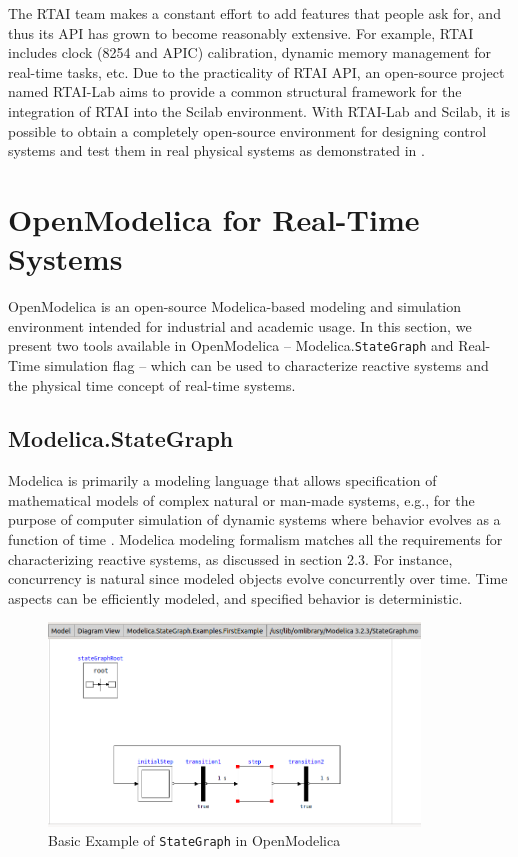 \documentclass[12pt]{report}
\begin{document}
The RTAI team makes a constant effort to add features that people ask for, and thus its API has grown to become reasonably extensive. For example, RTAI includes clock (8254 and APIC) calibration, dynamic memory management for real-time tasks, etc. Due to the practicality of RTAI API,  an open-source project named  RTAI-Lab aims to provide a common structural framework for the integration of RTAI into the Scilab environment. With RTAI-Lab and Scilab, it is possible to obtain a completely open-source environment for designing control systems and test them in real physical systems as demonstrated in \cite{scilab-rtai}.  

\section{OpenModelica for Real-Time Systems}
OpenModelica \cite{OM} is an open-source Modelica-based modeling and simulation environment intended for industrial and academic usage. In this section, we present two tools available in OpenModelica -- Modelica.\texttt{StateGraph} \cite{stategraph} and Real-Time simulation flag \cite{flags} -- which can be used to characterize reactive systems and the physical time concept of real-time systems. 

\subsection{Modelica.StateGraph}
Modelica is primarily a modeling language that allows specification of mathematical models of complex natural or man-made systems, e.g., for the purpose of computer simulation of dynamic systems
where behavior evolves as a function of time \cite{OMbook}. Modelica modeling formalism matches all the requirements for characterizing reactive systems, as discussed in section 2.3. For instance, concurrency is natural since modeled objects evolve concurrently over time. Time aspects can be efficiently modeled, and specified behavior is deterministic.\\

\begin{figure}[h]
\centering
\includegraphics[width=0.88\textwidth]{images/stategraph.png}
\caption{Basic Example of \texttt{StateGraph} in OpenModelica}
\label{fig:stategraph}
\end{figure}
\end{document}
